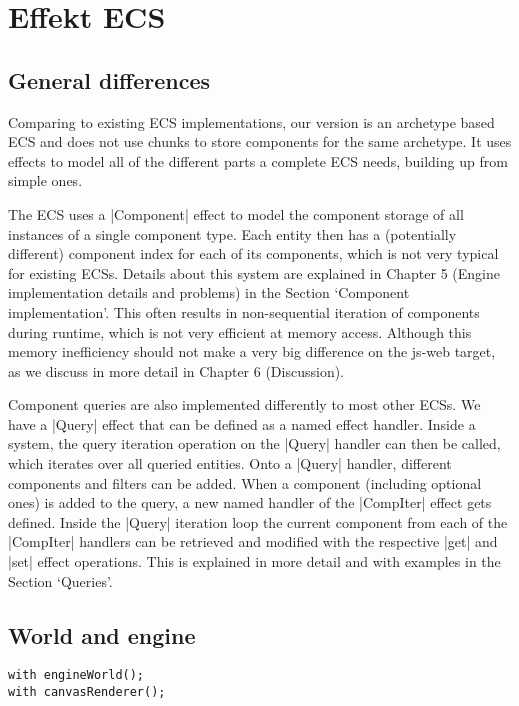 \chapter{Effekt ECS}\label{chap:ecs}

\section{General differences}

Comparing to existing ECS implementations, our version is an archetype based ECS and does not use chunks to store components for the same archetype. It uses effects to model all of the different parts a complete ECS needs, building up from simple ones.

The ECS uses a |Component| effect to model the component storage of all instances of a single component type. Each entity then has a (potentially different) component index for each of its components, which is not very typical for existing ECSs. Details about this system are explained in Chapter 5 (Engine implementation details and problems) in the Section `Component implementation'. This often results in non-sequential iteration of components during runtime, which is not very efficient at memory access. Although this memory inefficiency should not make a very big difference on the \textsf{js-web} target, as we discuss in more detail in Chapter 6 (Discussion).

Component queries are also implemented differently to most other ECSs. We have a |Query| effect that can be defined as a named effect handler. Inside a system, the query iteration operation on the |Query| handler can then be called, which iterates over all queried entities. Onto a |Query| handler, different components and filters can be added. When a component (including optional ones) is added to the query, a new named handler of the |CompIter| effect gets defined. Inside the |Query| iteration loop the current component from each of the |CompIter| handlers can be retrieved and modified with the respective |get| and |set| effect operations. This is explained in more detail and with examples in the Section `Queries'.

\section{World and engine}

\begin{lstlisting}[caption=Engine initialization]
with engineWorld();
with canvasRenderer();
\end{lstlisting}

